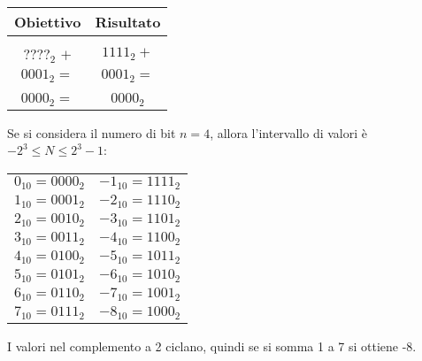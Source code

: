 \documentclass[a4paper]{article}
\theoremstyle{break}
\theoremstyle{break}
\theoremstyle{break}
\theoremstyle{break}
\begin{document}
\begin{center}
	\begin{tabular}{ c|c }
		Obiettivo            & Risultato      \\
		\hline                                \\
		\( ????_2 \) \( + \) & \( 1111_2 + \) \\
		\( 0001_2 = \)       & \( 0001_2 = \) \\ [2ex]
		\hline                                \\
		\( 0000_2 = \)       & \( 0000_2 \)   \\
	\end{tabular}
\end{center}

Se si considera il numero di bit \( n=4 \), allora l'intervallo di valori è
\( -2^3 \le N \le 2^3-1 \):

\begin{center}
	\begin{tabular}{c|c}
		\( 0_{10} = 0000_{2}\) & \( -1_{10} = 1111_{2}\) \\
		\( 1_{10} = 0001_{2}\) & \( -2_{10} = 1110_{2}\) \\
		\( 2_{10} = 0010_{2}\) & \( -3_{10} = 1101_{2}\) \\
		\( 3_{10} = 0011_{2}\) & \( -4_{10} = 1100_{2}\) \\
		\( 4_{10} = 0100_{2}\) & \( -5_{10} = 1011_{2}\) \\
		\( 5_{10} = 0101_{2}\) & \( -6_{10} = 1010_{2}\) \\
		\( 6_{10} = 0110_{2}\) & \( -7_{10} = 1001_{2}\) \\
		\( 7_{10} = 0111_{2}\) & \( -8_{10} = 1000_{2}\) \\
	\end{tabular}
\end{center}
I valori nel complemento a 2 ciclano, quindi se si somma 1 a 7 si ottiene -8.
\end{document}
